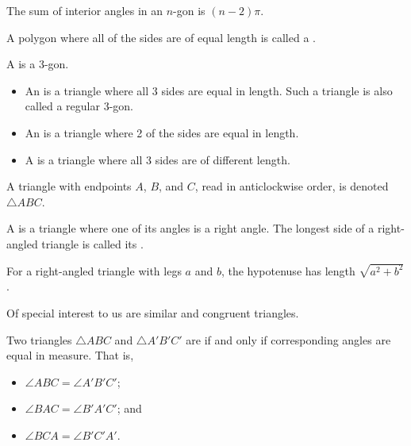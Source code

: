 \begin{proposition}
    The sum of interior angles in an $n$-gon is $(n-2)\pi$.
\end{proposition}

\begin{definition}
    A polygon where all of the sides are of equal length is called a .
\end{definition}

\begin{definition}
    A  is a 3-gon.
    \begin{itemize}
        \item An  is a triangle where all 3 sides are equal in length. Such a triangle is also called a regular 3-gon.
        \item An  is a triangle where 2 of the sides are equal in length.
        \item A  is a triangle where all 3 sides are of different length.
    \end{itemize}
    A triangle with endpoints $A$, $B$, and $C$, read in anticlockwise order, is denoted $\triangle ABC$.
\end{definition}

\begin{definition}
    A  is a triangle where one of its angles is a right angle. The longest side of a right-angled triangle is called its .
\end{definition}

\begin{theorem}[Pythagoras]
    For a right-angled triangle with legs $a$ and $b$, the hypotenuse has length $\sqrt{a^2 + b^2}$.
\end{theorem}

Of special interest to us are similar and congruent triangles.

\begin{definition}
    Two triangles $\triangle ABC$ and $\triangle A'B'C'$ are  if and only if corresponding angles are equal in measure. That is,
    \begin{itemize}
        \item $\angle ABC = \angle A'B'C'$;
        \item $\angle BAC = \angle B'A'C'$; and
        \item $\angle BCA = \angle B'C'A'$.
    \end{itemize}
\end{definition}



